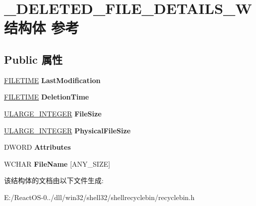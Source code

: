 \hypertarget{struct___d_e_l_e_t_e_d___f_i_l_e___d_e_t_a_i_l_s___w}{}\section{\+\_\+\+D\+E\+L\+E\+T\+E\+D\+\_\+\+F\+I\+L\+E\+\_\+\+D\+E\+T\+A\+I\+L\+S\+\_\+\+W结构体 参考}
\label{struct___d_e_l_e_t_e_d___f_i_l_e___d_e_t_a_i_l_s___w}
\subsection*{Public 属性}
\begin{DoxyCompactItemize}
\item 
\mbox{\label{struct___d_e_l_e_t_e_d___f_i_l_e___d_e_t_a_i_l_s___w_a5942779259c61c996f28385c1bd8ef0e}} 
\hyperlink{struct___f_i_l_e_t_i_m_e}{F\+I\+L\+E\+T\+I\+ME} {\bfseries Last\+Modification}
\item 
\mbox{\label{struct___d_e_l_e_t_e_d___f_i_l_e___d_e_t_a_i_l_s___w_a944103dcd7e295ba0278a8262282f21d}} 
\hyperlink{struct___f_i_l_e_t_i_m_e}{F\+I\+L\+E\+T\+I\+ME} {\bfseries Deletion\+Time}
\item 
\mbox{\label{struct___d_e_l_e_t_e_d___f_i_l_e___d_e_t_a_i_l_s___w_aa18b67e1e352f71d5e614cabb25a2ed7}} 
\hyperlink{struct___u_l_a_r_g_e___i_n_t_e_g_e_r}{U\+L\+A\+R\+G\+E\+\_\+\+I\+N\+T\+E\+G\+ER} {\bfseries File\+Size}
\item 
\mbox{\label{struct___d_e_l_e_t_e_d___f_i_l_e___d_e_t_a_i_l_s___w_ab9d4adc31bce1992a10c0a69f14c4700}} 
\hyperlink{struct___u_l_a_r_g_e___i_n_t_e_g_e_r}{U\+L\+A\+R\+G\+E\+\_\+\+I\+N\+T\+E\+G\+ER} {\bfseries Physical\+File\+Size}
\item 
\mbox{\label{struct___d_e_l_e_t_e_d___f_i_l_e___d_e_t_a_i_l_s___w_a5bc8b60f3e63a289b463d7b381b7a648}} 
D\+W\+O\+RD {\bfseries Attributes}
\item 
\mbox{\label{struct___d_e_l_e_t_e_d___f_i_l_e___d_e_t_a_i_l_s___w_a1911ac49168f56cf74fa455bdaccf09f}} 
W\+C\+H\+AR {\bfseries File\+Name} \mbox{[}A\+N\+Y\+\_\+\+S\+I\+ZE\mbox{]}
\end{DoxyCompactItemize}


该结构体的文档由以下文件生成\+:\begin{DoxyCompactItemize}
\item 
E\+:/\+React\+O\+S-\/0../dll/win32/shell32/shellrecyclebin/recyclebin.\+h\end{DoxyCompactItemize}
